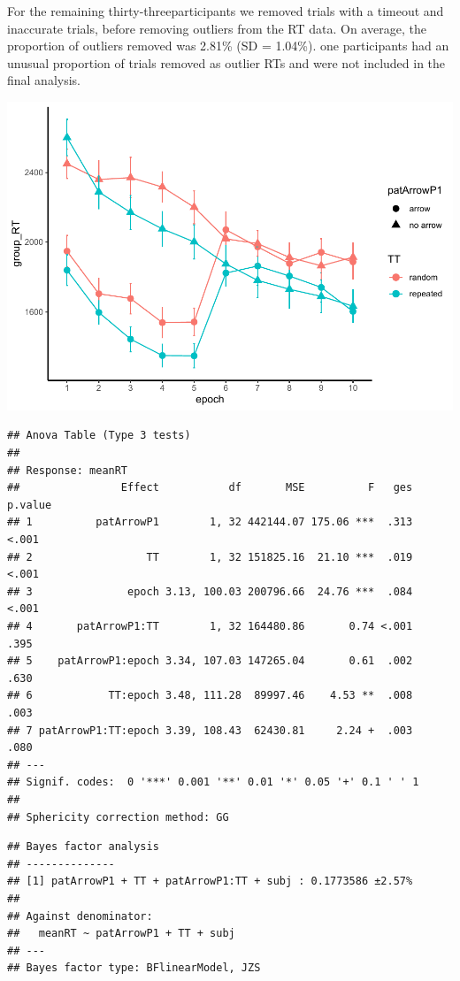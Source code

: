 \documentclass[
  man]{apa6}
\begin{document}
For the remaining thirty-threeparticipants we removed trials with a timeout and inaccurate trials, before removing outliers from the RT data. On average, the proportion of outliers removed was 2.81\% (SD = 1.04\%). one participants had an unusual proportion of trials removed as outlier RTs and were not included in the final analysis.

\includegraphics{CCC_ms1_files/figure-latex/unnamed-chunk-9-1.pdf}

\begin{verbatim}
## Anova Table (Type 3 tests)
## 
## Response: meanRT
##                Effect           df       MSE          F   ges p.value
## 1          patArrowP1        1, 32 442144.07 175.06 ***  .313   <.001
## 2                  TT        1, 32 151825.16  21.10 ***  .019   <.001
## 3               epoch 3.13, 100.03 200796.66  24.76 ***  .084   <.001
## 4       patArrowP1:TT        1, 32 164480.86       0.74 <.001    .395
## 5    patArrowP1:epoch 3.34, 107.03 147265.04       0.61  .002    .630
## 6            TT:epoch 3.48, 111.28  89997.46    4.53 **  .008    .003
## 7 patArrowP1:TT:epoch 3.39, 108.43  62430.81     2.24 +  .003    .080
## ---
## Signif. codes:  0 '***' 0.001 '**' 0.01 '*' 0.05 '+' 0.1 ' ' 1
## 
## Sphericity correction method: GG
\end{verbatim}

\begin{verbatim}
## Bayes factor analysis
## --------------
## [1] patArrowP1 + TT + patArrowP1:TT + subj : 0.1773586 ±2.57%
## 
## Against denominator:
##   meanRT ~ patArrowP1 + TT + subj 
## ---
## Bayes factor type: BFlinearModel, JZS
\end{verbatim}
\end{document}

